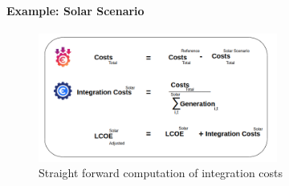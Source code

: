 \documentclass[aspectratio=169]{beamer}
\begin{document}
\begin{frame}{\insertsectionhead}
\framesubtitle{Example: Solar Scenario}
\begin{figure}
    \centering
    \includegraphics[width=0.7\textwidth]{metr.png}
  
  \caption*{\small Straight forward computation of integration costs}
  \end{figure}
\end{frame}
\end{document}
